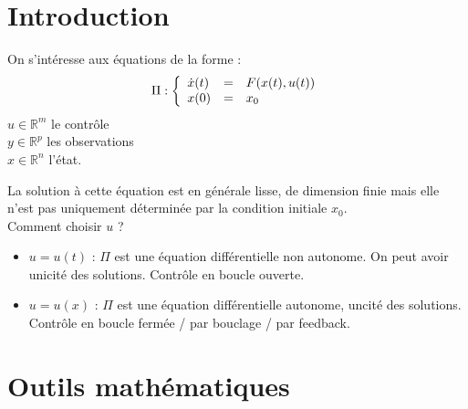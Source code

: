 \section*{Introduction}
On s'intéresse aux équations de la forme :
\[\Pi : \left\{\begin{array}{l c l}
	\dot{x}(t)&=&F(x(t),u(t))\\
	x(0)&=&x_0
\end{array}\right.\]
$u\in\mathbb{R}^m$ le contrôle\\
$y\in\mathbb{R}^p$ les observations\\
$x\in\mathbb{R}^n$ l'état.

\bigskip
La solution à cette équation est en générale lisse, de dimension finie mais elle n'est pas uniquement déterminée par la condition initiale $x_0$.\\
Comment choisir $u$ ?
\begin{itemize}
	\item $u=u(t)$ : $\Pi$ est une équation différentielle non autonome. On peut avoir unicité des solutions. Contrôle en boucle ouverte.
	\item $u=u(x)$ : $\Pi$ est une équation différentielle autonome, uncité des solutions. Contrôle en boucle fermée / par bouclage / par feedback.
\end{itemize}

\section{Outils mathématiques}
